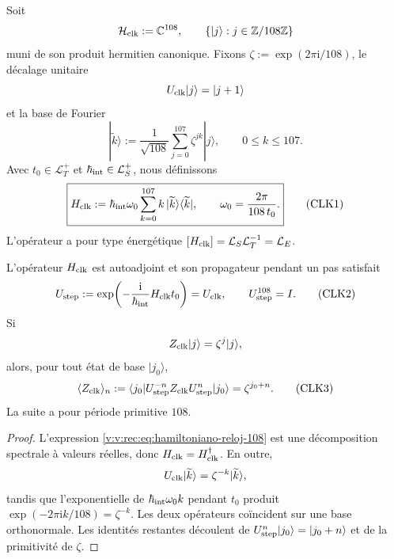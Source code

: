 Soit
\[
 \mathcal H_{\rm clk}:=\mathbb C^{108},
 \qquad
 \{|j\rangle:j\in\mathbb Z/108\mathbb Z\}
\]
muni de son produit hermitien canonique. Fixons
\(\zeta:=\exp(2\pi\mathrm i/108)\), le décalage unitaire
\[
 U_{\rm clk}|j\rangle=|j+1\rangle
\]
et la base de Fourier
\[
 |\widetilde k\rangle
 :=\frac1{\sqrt{108}}\sum_{j=0}^{107}\zeta^{jk}|j\rangle,
 \qquad 0\leq k\leq107.
\]
Avec \(t_0\in\mathcal L_T^+\) et
\(\hbar_{\rm int}\in\mathcal L_S^+\), nous définissons
\[
 \boxed{
 H_{\rm clk}
 :=\hbar_{\rm int}\omega_0
 \sum_{k=0}^{107}k\,
 |\widetilde k\rangle\langle\widetilde k|,
 \qquad
 \omega_0=\frac{2\pi}{108\,t_0}.}
 \tag{CLK1}\label{v:v:rec:eq:hamiltoniano-reloj-108}
\]
L’opérateur a pour type énergétique
\([H_{\rm clk}]=\mathcal L_S\mathcal L_T^{-1}=\mathcal L_E\).

\begin{theorem}
\label{v:v:rec:thm:reloj-unitario-108}
L’opérateur \(H_{\rm clk}\) est autoadjoint et son propagateur pendant un pas
satisfait
\[
 U_{\rm step}
 :=\exp\!\left(-\frac{\mathrm i}{\hbar_{\rm int}}
 H_{\rm clk}t_0\right)
 =U_{\rm clk},
 \qquad
 U_{\rm step}^{108}=I.
 \tag{CLK2}\label{v:v:rec:eq:propagador-reloj-108}
\]
Si
\[
 Z_{\rm clk}|j\rangle=\zeta^j|j\rangle,
\]
alors, pour tout état de base \(|j_0\rangle\),
\[
 \langle Z_{\rm clk}\rangle_{n}
 :=\langle j_0|U_{\rm step}^{-n}Z_{\rm clk}
 U_{\rm step}^n|j_0\rangle
 =\zeta^{j_0+n}.
 \tag{CLK3}\label{v:v:rec:eq:respuesta-reloj-108}
\]
La suite a pour période primitive \(108\).
\end{theorem}

\begin{proof}
L’expression \eqref{v:v:rec:eq:hamiltoniano-reloj-108} est une décomposition
spectrale à valeurs réelles, donc \(H_{\rm clk}=H_{\rm clk}^\dagger\).
En outre,
\[
 U_{\rm clk}|\widetilde k\rangle
 =\zeta^{-k}|\widetilde k\rangle,
\]
tandis que l’exponentielle de
\(\hbar_{\rm int}\omega_0 k\) pendant \(t_0\) produit
\(\exp(-2\pi\mathrm ik/108)=\zeta^{-k}\). Les deux opérateurs coïncident sur
une base orthonormale. Les identités restantes découlent de
\(U_{\rm step}^n|j_0\rangle=|j_0+n\rangle\) et de la primitivité de
\(\zeta\).
\end{proof}

